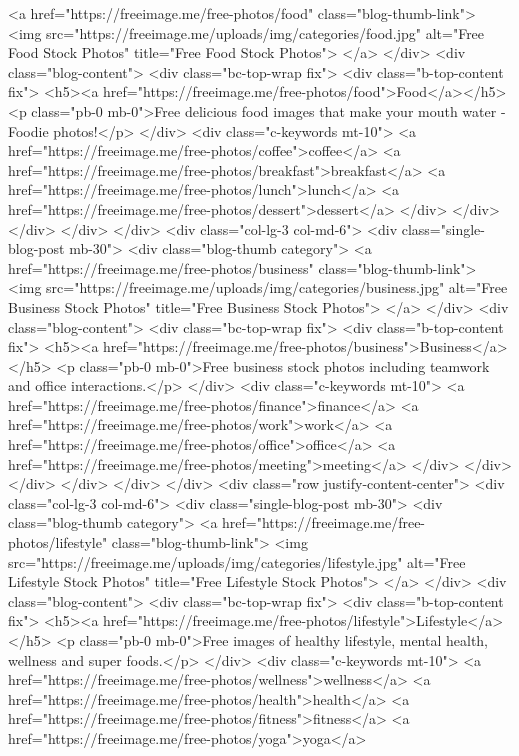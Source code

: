 <a href="https://freeimage.me/free-photos/food" class="blog-thumb-link">
<img src="https://freeimage.me/uploads/img/categories/food.jpg" alt="Free Food Stock Photos" title="Free Food Stock Photos">
</a>
</div>
<div class="blog-content">
<div class="bc-top-wrap fix">
<div class="b-top-content fix">
<h5><a href="https://freeimage.me/free-photos/food">Food</a></h5>
<p class="pb-0 mb-0">Free delicious food images that make your mouth water - Foodie photos!</p>
</div>
<div class="c-keywords mt-10">
<a href="https://freeimage.me/free-photos/coffee">coffee</a> <a href="https://freeimage.me/free-photos/breakfast">breakfast</a> <a href="https://freeimage.me/free-photos/lunch">lunch</a> <a href="https://freeimage.me/free-photos/dessert">dessert</a>
</div>
</div>
</div>
</div>
</div>
<div class="col-lg-3 col-md-6">
<div class="single-blog-post mb-30">
<div class="blog-thumb category">
<a href="https://freeimage.me/free-photos/business" class="blog-thumb-link">
<img src="https://freeimage.me/uploads/img/categories/business.jpg" alt="Free Business Stock Photos" title="Free Business Stock Photos">
</a>
</div>
<div class="blog-content">
<div class="bc-top-wrap fix">
<div class="b-top-content fix">
<h5><a href="https://freeimage.me/free-photos/business">Business</a></h5>
<p class="pb-0 mb-0">Free business stock photos including teamwork and office interactions.</p>
</div>
<div class="c-keywords mt-10">
<a href="https://freeimage.me/free-photos/finance">finance</a> <a href="https://freeimage.me/free-photos/work">work</a> <a href="https://freeimage.me/free-photos/office">office</a> <a href="https://freeimage.me/free-photos/meeting">meeting</a>
</div>
</div>
</div>
</div>
</div>
</div>
<div class="row justify-content-center">
<div class="col-lg-3 col-md-6">
<div class="single-blog-post mb-30">
<div class="blog-thumb category">
<a href="https://freeimage.me/free-photos/lifestyle" class="blog-thumb-link">
<img src="https://freeimage.me/uploads/img/categories/lifestyle.jpg" alt="Free Lifestyle Stock Photos" title="Free Lifestyle Stock Photos">
</a>
</div>
<div class="blog-content">
<div class="bc-top-wrap fix">
<div class="b-top-content fix">
<h5><a href="https://freeimage.me/free-photos/lifestyle">Lifestyle</a></h5>
<p class="pb-0 mb-0">Free images of healthy lifestyle, mental health, wellness and super foods.</p>
</div>
<div class="c-keywords mt-10">
<a href="https://freeimage.me/free-photos/wellness">wellness</a> <a href="https://freeimage.me/free-photos/health">health</a> <a href="https://freeimage.me/free-photos/fitness">fitness</a> <a href="https://freeimage.me/free-photos/yoga">yoga</a>
